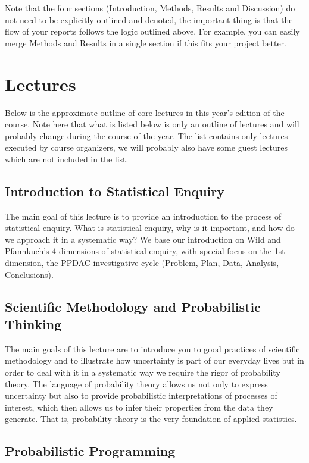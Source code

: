 \documentclass[fleqn,moreauthors,10pt]{ds_report}
\begin{document}
Note that the four sections (Introduction, Methods, Results and Discussion) do not need to be explicitly outlined and denoted, the important thing is that the flow of your reports follows the logic outlined above. For example, you can easily merge Methods and Results in a single section if this fits your project better.

\section*{Lectures}

Below is the approximate outline of core lectures in this year's edition of the course. Note here that what is listed below is only an outline of lectures and will probably change during the course of the year. The list contains only lectures executed by course organizers, we will probably also have some guest lectures which are not included in the list.

\subsection*{Introduction to Statistical Enquiry}

The main goal of this lecture is to provide an introduction to the process of statistical enquiry. What is statistical enquiry, why is it important, and how do we approach it in a systematic way? We base our introduction on Wild and Pfannkuch’s 4 dimensions of statistical enquiry, with special focus on the 1st dimension, the PPDAC investigative cycle (Problem, Plan, Data, Analysis, Conclusions).

\subsection*{Scientific Methodology and Probabilistic Thinking}

The main goals of this lecture are to introduce you to good practices of scientific methodology and to illustrate how uncertainty is part of our everyday lives but in order to deal with it in a systematic way we require the rigor of probability theory. The language of probability theory allows us not only to express uncertainty but also to provide probabilistic interpretations of processes of interest, which then allows us to infer their properties from the data they generate. That is, probability theory is the very foundation of applied statistics.

\subsection*{Probabilistic Programming}
\end{document}
